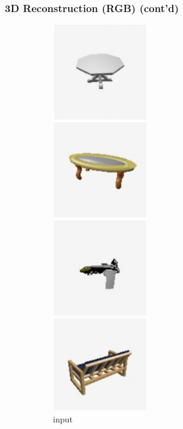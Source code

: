 \documentclass[14pt]{beamer}
\begin{document}
  \begin{frame}
    \frametitle{3D Reconstruction (RGB) (cont'd)}
    \begin{figure}
      \begin{subfigure}[t]{0.18\textwidth}
        \centering
        \includegraphics[scale=0.39]{qual_rgb_input}\\
        {\footnotesize input}
      \end{subfigure}
      \begin{subfigure}[t]{0.18\textwidth}
        \centering

\end{subfigure}
\end{figure}
\end{frame}
\end{document}
